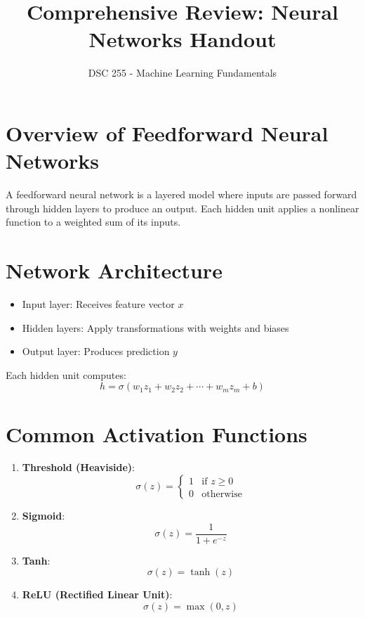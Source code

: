 \documentclass[11pt]{article}
\title{Comprehensive Review: Neural Networks Handout}
\author{DSC 255 - Machine Learning Fundamentals}
\date{}
\begin{document}
\maketitle
\tableofcontents
\newpage

\section{Overview of Feedforward Neural Networks}

A feedforward neural network is a layered model where inputs are passed forward through hidden layers to produce an output. Each hidden unit applies a nonlinear function to a weighted sum of its inputs.

\section{Network Architecture}

\begin{itemize}
    \item Input layer: Receives feature vector $x$
    \item Hidden layers: Apply transformations with weights and biases
    \item Output layer: Produces prediction $y$
\end{itemize}

Each hidden unit computes:
\[
h = \sigma(w_1 z_1 + w_2 z_2 + \cdots + w_m z_m + b)
\]

\section{Common Activation Functions}

\begin{enumerate}[label=(\alph*)]
    \item \textbf{Threshold (Heaviside)}:
    \[
    \sigma(z) = 
    \begin{cases}
    1 & \text{if } z \geq 0 \\
    0 & \text{otherwise}
    \end{cases}
    \]

    \item \textbf{Sigmoid}:
    \[
    \sigma(z) = \frac{1}{1 + e^{-z}}
    \]

    \item \textbf{Tanh}:
    \[
    \sigma(z) = \tanh(z)
    \]

    \item \textbf{ReLU (Rectified Linear Unit)}:
    \[
    \sigma(z) = \max(0, z)
    \]
\end{enumerate}
\end{document}
